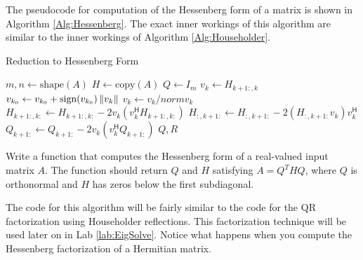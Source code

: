 The pseudocode for computation of the Hessenberg form of a matrix is shown in Algorithm \ref{Alg:Hessenberg}.
The exact inner workings of this algorithm are similar to the inner workings of Algorithm \ref{Alg:Householder}.

\begin{algorithm}
\caption{Reduction to Hessenberg Form}
\label{Alg:Hessenberg}
\begin{algorithmic}[1]
\State $m, n \gets \text{shape}(A)$
\State $H \gets \text{copy}(A)$
\State $Q \gets I_m$
    \State $v_k \gets H_{k+1:, k}$
    \State $v_{k_0} \gets v_{k_0} + \text{sign}(v_{k_0}) \left\lVert v_k\right\rVert$
    \State $v_k \gets v_k/norm{v_k}$
    \State $H_{k+1:,k:} \gets H_{k+1:,k:} - 2v_k(v_k^\mathsf{H} H_{k+1:,k:})$
    \State $H_{:,k+1:} \gets H_{:,k+1:} - 2(H_{:,k+1:} v_k) v_k^\mathsf{H}$
    \State $Q_{k+1:} \gets Q_{k+1:} - 2v_k(v_k^\mathsf{H} Q_{k+1:})$
\EndFor
\State {} $Q, R$
\EndProcedure
\end{algorithmic}
\end{algorithm}

\begin{problem}
Write a function  that computes the Hessenberg form of a real-valued
input matrix $A$. The function should return $Q$ and $H$ satisfying $A = Q^THQ$,
where $Q$ is orthonormal and $H$ has zeros below the first subdiagonal.

The code for this algorithm will be fairly similar to the code for the QR factorization using Householder reflections.
This factorization technique will be used later on in Lab \ref{lab:EigSolve}.
Notice what happens when you compute the Hessenberg factorization of a Hermitian matrix.
\end{problem}


